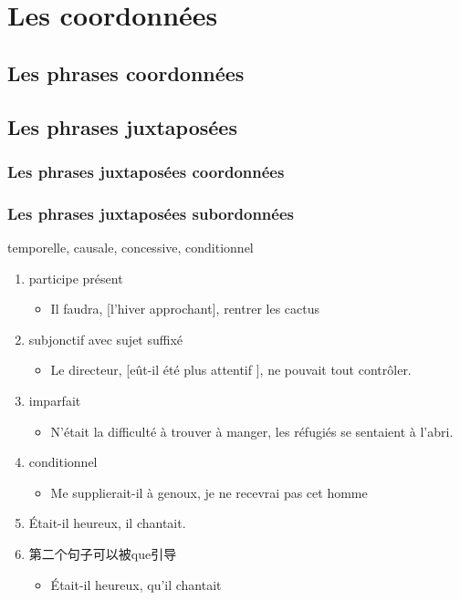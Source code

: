 \documentclass[UTF8]{report}
\begin{document}
\section{Les coordonnées}

\subsection{Les phrases coordonnées}

\subsection{Les phrases juxtaposées}

\subsubsection{Les phrases juxtaposées coordonnées}

\subsubsection{Les phrases juxtaposées subordonnées}
temporelle, causale, concessive, conditionnel
\begin{enumerate}
    \item participe présent
    \begin{itemize}
        \item Il faudra, [l’hiver approchant], rentrer les cactus
    \end{itemize}
    \item subjonctif avec sujet suffixé
    \begin{itemize}
        \item Le directeur, [eût-il été plus attentif ], ne pouvait tout contrôler.
    \end{itemize}
    \item imparfait
    \begin{itemize}
        \item N’était la difficulté à trouver à manger, les réfugiés se sentaient à l’abri.
    \end{itemize}
    \item conditionnel
    \begin{itemize}
        \item Me supplierait-il à genoux, je ne recevrai pas cet homme
    \end{itemize}
    \item Était-il heureux, il chantait.
    \item 第二个句子可以被que引导
    \begin{itemize}
        \item Était-il heureux, qu’il chantait
    \end{itemize}
\end{enumerate}
\end{document}
